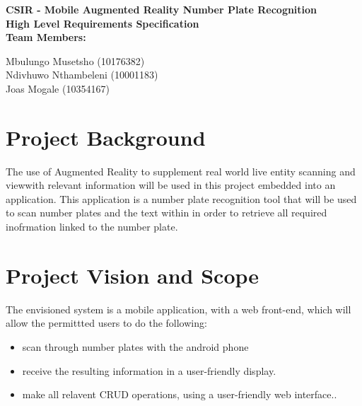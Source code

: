 \documentclass[12pt]{article}
\newcommand{\Title}{CSIR - Mobile Augmented Reality Number Plate Recognition} %
\begin{document}
        \vspace{4em}
        
        \begin{center}%
        	
		
          \LARGE \bf \Title \\[4em]
          \LARGE {\bf High Level Requirements Specification}\\[1em]
          \LARGE {\bf Team Members:}\\[2em]
          \large
          
             Mbulungo Musetsho                          (10176382) \\[1em]
             Ndivhuwo Nthambeleni (10001183)	\\[1em]
             Joas Mogale (10354167)		\\[1em]
            
        \end{center}%
        

        \newpage
        \tableofcontents    
                \newpage
                \section{Project Background}
               	\vspace{0.1in}
               	The use of Augmented Reality to supplement real world live entity scanning and viewwith relevant information will be used in this project embedded into an application. This application is a number plate recognition tool that will be used to scan number plates and the text within in order to retrieve all required inofrmation linked to the number plate.
               	
               	\vspace{0.2in}
                \section{Project Vision and Scope}
                \vspace{0.1in}
                The envisioned system is a mobile application, with a web front-end, which will allow the permittted users to do the following:
                \begin{itemize}
	                \item scan through number plates with the android phone
	                \item receive the resulting information in a user-friendly display.
	                \item make all relavent CRUD operations, using a user-friendly web interface..
	                
                \end{itemize}
                
\end{document}
